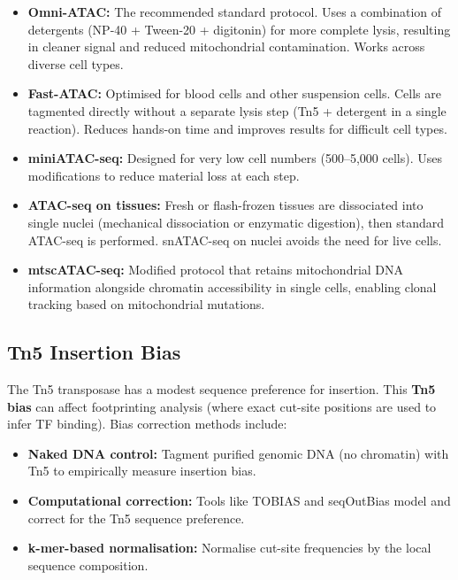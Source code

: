 \begin{itemize}[itemsep=3pt]
  \item \textbf{Omni-ATAC:} The recommended standard protocol. Uses a combination of detergents (NP-40 + Tween-20 + digitonin) for more complete lysis, resulting in cleaner signal and reduced mitochondrial contamination. Works across diverse cell types.
  \item \textbf{Fast-ATAC:} Optimised for blood cells and other suspension cells. Cells are tagmented directly without a separate lysis step (Tn5 + detergent in a single reaction). Reduces hands-on time and improves results for difficult cell types.
  \item \textbf{miniATAC-seq:} Designed for very low cell numbers (500--5,000 cells). Uses modifications to reduce material loss at each step.
  \item \textbf{ATAC-seq on tissues:} Fresh or flash-frozen tissues are dissociated into single nuclei (mechanical dissociation or enzymatic digestion), then standard ATAC-seq is performed. snATAC-seq on nuclei avoids the need for live cells.
  \item \textbf{mtscATAC-seq:} Modified protocol that retains mitochondrial DNA information alongside chromatin accessibility in single cells, enabling clonal tracking based on mitochondrial mutations.
\end{itemize}

\subsection{Tn5 Insertion Bias}
\label{subsec:chromatin:tn5-bias}

The Tn5 transposase has a modest sequence preference for insertion. This \textbf{Tn5 bias} can affect footprinting analysis (where exact cut-site positions are used to infer TF binding). Bias correction methods include:

\begin{itemize}[itemsep=2pt]
  \item \textbf{Naked DNA control:} Tagment purified genomic DNA (no chromatin) with Tn5 to empirically measure insertion bias.
  \item \textbf{Computational correction:} Tools like TOBIAS and seqOutBias model and correct for the Tn5 sequence preference.
  \item \textbf{k-mer-based normalisation:} Normalise cut-site frequencies by the local sequence composition.
\end{itemize}

